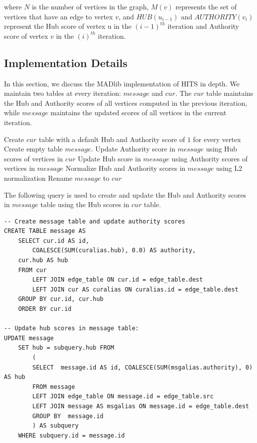 where $N$ is the number of vertices in the graph, $M(v)$ represents the set of
vertices that have an edge to vertex $v$, and $HUB(u_{i-1})$ and $AUTHORITY
(v_{i})$ represent the Hub score of vertex {u} in the $(i-1) ^{th}$ iteration and
Authority score of vertex $v$ in the $(i)^{th}$ iteration.

\subsection{Implementation Details} \label{sec:hits:implementation}

In this section, we discuss the MADlib implementation of HITS in depth.
We maintain two tables at every iteration: $message$ and $cur$. The
$cur$ table maintains the Hub and Authority scores of all vertices
computed in the previous iteration, while $message$ maintains the updated scores
of all vertices in the current iteration.

\begin{algorithm}[HITS$(V,E)$] \label{alg:hits:high}
\begin{algorithmic}[1]
	\State Create $cur$ table with a default Hub and Authority score of
			${1}$ for every vertex
	\Repeat
        \State Create empty table $message$.
        \State Update Authority score in $message$ using Hub scores of vertices
        in $cur$
        \State Update Hub score in $message$ using Authority scores of vertices
        in $message$
        \State Normalize Hub and Authority scores in $message$ using L2
        normalization
        \State Rename $message$ to $cur$
\end{algorithmic}
\end{algorithm}

The following query is used to create and update the Hub and Authority scores
in $message$ table using the Hub scores in $cur$ table.

\begin{algorithm}
\label{alg:hits:update}
\begin{lstlisting}
-- Create message table and update authority scores
CREATE TABLE message AS
	SELECT cur.id AS id,
		COALESCE(SUM(curalias.hub), 0.0) AS authority,
	cur.hub AS hub
	FROM cur
        LEFT JOIN edge_table ON cur.id = edge_table.dest
        LEFT JOIN cur AS curalias ON curalias.id = edge_table.dest
	GROUP BY cur.id, cur.hub
	ORDER BY cur.id

-- Update hub scores in message table:
UPDATE message
	SET hub = subquery.hub FROM
		(
		SELECT  message.id AS id, COALESCE(SUM(msgalias.authority), 0) AS hub
		FROM message
		LEFT JOIN edge_table ON message.id = edge_table.src
		LEFT JOIN message AS msgalias ON message.id = edge_table.dest
		GROUP BY  message.id
		) AS subquery
	WHERE subquery.id = message.id

\end{lstlisting}
\end{algorithm}


